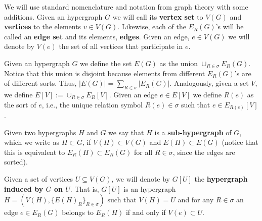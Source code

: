 \documentclass[12pt,notitlepage,a4paper]{article}
\theoremstyle{definition}
\newcommand{\aut}{\mathrm{aut}}
\begin{document}
We will use standard nomenclature and notation
from graph theory with some additions. Given an 
hypergraph $G$ we will call its \textbf{vertex set} to $V(G)$ 
and \textbf{vertices} 
to the elements $v\in V(G)$. Likewise, each of 
the $E_R(G)$'s will be called an \textbf{edge set} and its elements, 
\textbf{edges}. Given an edge, $e\in V(G)$ we will denote by $V(e)$
the set of all vertices that participate in $e$. 

\par
Given an hypergraph $G$ we define the set $E(G)$ as the
union $\cup_{R\in \sigma}E_R(G)$. Notice that this union 
is disjoint because elements from different $E_R(G)$'s 
are of different sorts. Thus, $|E(G)|=\sum_{R\in \sigma} 
|E_R(G)|$. Analogously, given a set $V$, we define
$E[V]:=\cup_{R\in \sigma} E_R[V]$.
Given an edge $e\in E[V]$ we define $R(e)$
as the sort of $e$, i.e.,
the unique relation symbol $R(e)\in \sigma$
such that $e\in E_{R(e)}[V]$.

Given two hypergraphs $H$ and $G$ we say that $H$
is a \textbf{sub-hypergraph} of $G$, which we write as $H\subset G$,
if $V(H)\subset V(G)$ and $E(H)\subset E(G)$ (notice 
that this is equivalent to $E_R(H)\subset E_R(G)$ for all
$R\in \sigma$, since the edges are sorted).\par


Given a set of vertices $U\subseteq V(G)$, 
we will denote by $G[U]$ the \textbf{hypergraph induced
by $G$ on $U$}. That is, $G[U]$ is an hypergraph
$H=(V(H),\{E(H)_R\}_{R\in \sigma})$ such that 
$V(H)=U$ and for any $R\in \sigma$ 
an edge $e\in E_R(G)$ belongs 
to $E_R(H)$ if and only if $V(e)\subset U$.
\par
%
%

%
\end{document}
